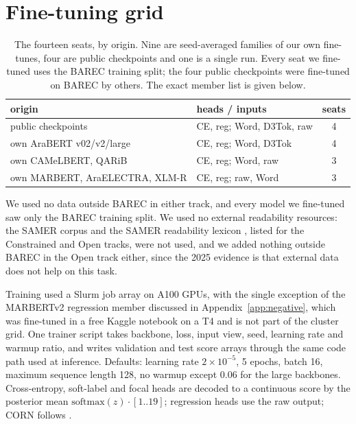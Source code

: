 \section{Fine-tuning grid}
\label{app:fleet}

\begin{table}[t]
\centering\small
\begin{tabular}{@{}llc@{}}
\toprule
origin & heads / inputs & seats \\
\midrule
public checkpoints & CE, reg; Word, D3Tok, raw & 4 \\
own AraBERT v02/v2/large & CE, reg; Word, D3Tok & 4 \\
own CAMeLBERT, QARiB & CE, reg; Word, raw & 3 \\
own MARBERT, AraELECTRA, XLM-R & CE, reg; raw, Word & 3 \\
\bottomrule
\end{tabular}
\caption{The fourteen seats, by origin. Nine are seed-averaged families of our own
fine-tunes, four are public checkpoints and one is a single run. Every seat we fine-tuned uses
the BAREC training split; the four public checkpoints were fine-tuned on BAREC by others. The
exact member list is given
below.}
\label{tab:members}
\end{table}


We used no data outside BAREC in either track, and every model we fine-tuned saw only the BAREC training split. We used no external readability resources: the SAMER corpus \citep{alhafni-etal-2024-samer} and the SAMER readability lexicon \citep{al-khalil-etal-2020-large}, listed for the Constrained and Open tracks, were not used, and we added nothing outside BAREC in the Open track either, since the 2025 evidence is that external data does not help on this task.

Training used a Slurm job array on A100 GPUs, with the single exception of the MARBERTv2
regression member discussed in Appendix~\ref{app:negative}, which was fine-tuned in a free
Kaggle notebook on a T4 and is not part of the cluster grid. One trainer script takes backbone, loss,
input view, seed, learning rate and warmup ratio, and writes validation and test score
arrays through the same code path used at inference. Defaults: learning rate $2\times
10^{-5}$, 5 epochs, batch 16, maximum sequence length 128, no warmup except 0.06 for the
large backbones. Cross-entropy, soft-label and focal heads are decoded to a continuous score
by the posterior mean $\mathrm{softmax}(z) \cdot [1..19]$; regression heads use the raw
output; CORN follows \citet{shi-etal-2023-corn}.

